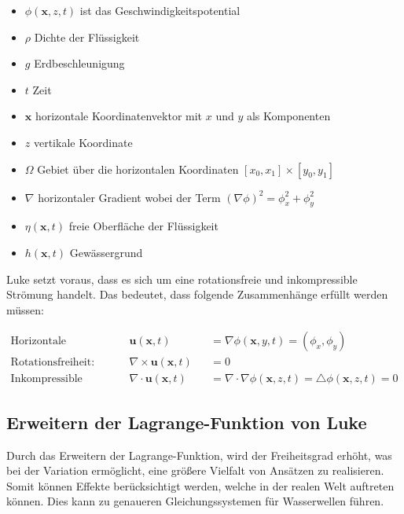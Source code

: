 \begin{itemize}
	\item
	$\phi(\bm{x},z,t)$ ist das Geschwindigkeitspotential
	\item
	$\rho$ Dichte der Flüssigkeit
	\item
	$g$ Erdbeschleunigung
	\item
	$t$ Zeit
	\item 
	$\bm{x}$ horizontale Koordinatenvektor mit $x$ und $y$ als Komponenten
	\item 
	$z$ vertikale Koordinate
	\item 
	$\Omega$ Gebiet über die horizontalen Koordinaten $[x_0,x_1]\times[y_0,y_1]$
	\item 
	$\nabla$ horizontaler Gradient wobei der Term $(\nabla \phi)^2 = \phi_x^2+\phi_y^2$
	\item 
	$\eta(\bm{x},t)$ freie Oberfläche der Flüssigkeit
	\item 
	$h(\bm{x},t)$ Gewässergrund 
	
\end{itemize}
Luke setzt voraus, dass es sich um eine rotationsfreie und inkompressible Strömung handelt.
Das bedeutet, dass folgende Zusammenhänge erfüllt werden müssen:

\begin{align*}
	\text{Horizontale Geschwindigkeit:}&\quad \bm{u}(\bm{x},t) &&= \nabla \phi (\bm{x}, y, t) = \left(\phi_x, \phi_y\right)
	\\
	\text{Rotationsfreiheit:}&\quad \nabla \times \bm{u}(\bm{x},t) &&= 0
	\\
	\text{Inkompressible Strömung:}&\quad \nabla \cdot \bm{u}(\bm{x},t) &&= \nabla \cdot \nabla \phi(\bm{x}, z, t) = \triangle \phi(\bm{x}, z, t) = 0
\end{align*}

\subsection{Erweitern der Lagrange-Funktion von Luke
	\label{luke:subsection:Erweitern}}

Durch das Erweitern der Lagrange-Funktion, wird der Freiheitsgrad erhöht, was bei der Variation ermöglicht, eine größere Vielfalt von Ansätzen zu realisieren.
Somit können Effekte berücksichtigt werden, welche in der realen Welt auftreten können. Dies kann zu genaueren Gleichungssystemen für Wasserwellen führen.

